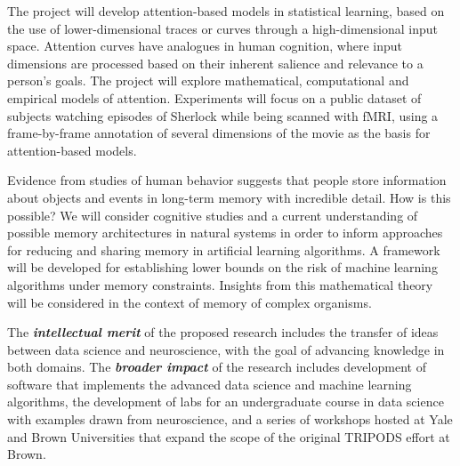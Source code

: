  The project will develop
attention-based models in statistical learning, based on the use
of lower-dimensional traces or curves through a high-dimensional
input space. Attention curves have analogues in human cognition, where
input dimensions are processed based on their inherent salience and
relevance to a person's goals. The project will explore mathematical,
computational and empirical models of attention. Experiments will
focus on a public dataset of subjects watching episodes of Sherlock
while being scanned with fMRI, using a frame-by-frame annotation of
several dimensions of the movie as the basis for attention-based models.


 Evidence from studies of human behavior
suggests that people store information about objects and events in
long-term memory with incredible detail. How is this possible?  
We will consider cognitive studies and
a current understanding of possible memory architectures in natural systems
in order to inform approaches for reducing and sharing memory in
artificial learning algorithms. A framework will be developed for
establishing lower bounds on the risk of machine learning algorithms under
memory constraints. Insights from this mathematical theory will be
considered in the context of memory of complex organisms.



\vskip8pt

\noindent 
The {\it\bfseries intellectual merit} of the proposed research
includes the transfer of ideas between data science and neuroscience,
with the goal of advancing knowledge in both domains.
The {\it\bfseries broader impact} of the research includes development of software that
implements the advanced data science and machine learning algorithms,
the development of labs for an undergraduate course 
in data science with examples drawn from neuroscience, and a series
of workshops hosted at Yale and Brown Universities that expand
the scope of the original TRIPODS effort at Brown.

